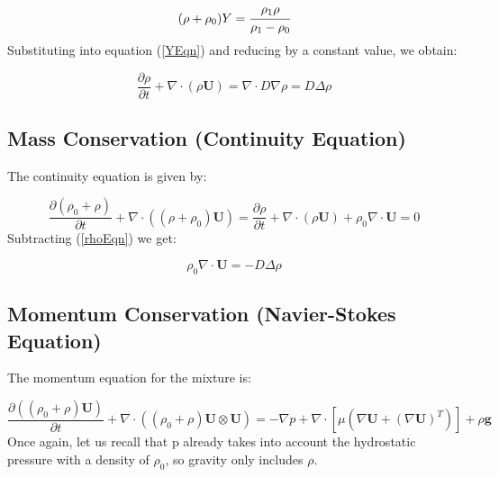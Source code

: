 \documentclass{article}
\begin{document}
\begin{equation}
    (\rho + \rho_0) Y = \cfrac{\rho_1 \rho }{\rho_1 - \rho_0} 
\end{equation}
Substituting into equation (\ref{YEqn}) and reducing by a constant value, we obtain:

\begin{equation}\label{rhoEqn}
    \frac{\partial \rho}{\partial t} + \nabla \cdot ( \rho  \mathbf{U}) = \nabla \cdot D \nabla \rho = D \Delta \rho
\end{equation}

\subsection{Mass Conservation (Continuity Equation)}
The continuity equation is given by:

\begin{equation}
\frac{\partial (\rho_0 + \rho)}{\partial t} + \nabla \cdot ( (\rho + \rho_0) \mathbf{U}) = \frac{\partial \rho}{\partial t} + \nabla \cdot ( \rho \mathbf{U}) + \rho_0 \nabla \cdot {\mathbf{U}} = 0
\end{equation}
Subtracting (\ref{rhoEqn}) we get:

\begin{equation}
 \rho_0 \nabla \cdot {\mathbf{U}} = - D \Delta \rho
\end{equation}

\subsection{Momentum Conservation (Navier-Stokes Equation)}

The momentum equation for the mixture is:

\begin{equation}
\frac{\partial ((\rho_0 + \rho) \mathbf{U})}{\partial t} + \nabla \cdot ((\rho_0 + \rho) \mathbf{U} \otimes \mathbf{U}) = -\nabla p
+ \nabla \cdot \left[ \mu (\nabla \mathbf{U} + (\nabla \mathbf{U})^T) \right] + \rho \mathbf{g}
\end{equation}
Once again, let us recall that p already takes into account the hydrostatic pressure with a density of $\rho_0$, so gravity only includes $\rho$.
\end{document}
